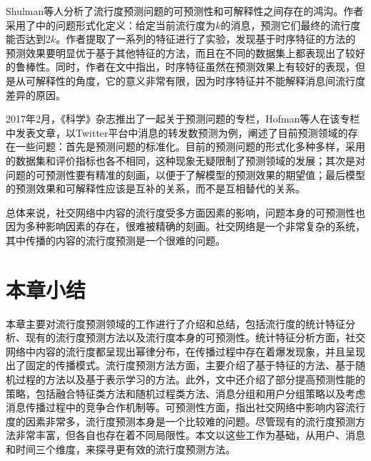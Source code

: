 Shulman等人\citep{shulman2016predictability}分析了流行度预测问题的可预测性和可解释性之间存在的鸿沟。作者采用了\citep{cheng2014can}中的问题形式化定义：给定当前流行度为$k$的消息，预测它们最终的流行度能否达到$2k$。作者提取了一系列的特征进行了实验，发现基于时序特征的方法的预测效果要明显优于基于其他特征的方法，而且在不同的数据集上都表现出了较好的鲁棒性。同时，作者在文中指出，时序特征虽然在预测效果上有较好的表现，但是从可解释性的角度，它的意义非常有限，因为时序特征并不能解释消息间流行度差异的原因。

2017年2月，《科学》杂志推出了一起关于预测问题的专栏\citep{Jasny468}，Hofman等人在该专栏中发表文章\citep{hofman2017prediction}，以Twitter平台中消息的转发数预测为例，阐述了目前预测领域的存在一些问题：首先是预测问题的标准化。目前的预测问题的形式化多种多样，采用的数据集和评价指标也各不相同，这种现象无疑限制了预测领域的发展；其次是对问题的可预测性要有精准的刻画，以便于了解模型的预测效果的期望值；最后模型的预测效果和可解释性应该是互补的关系，而不是互相替代的关系。

总体来说，社交网络中内容的流行度受多方面因素的影响，问题本身的可预测性也因为多种影响因素的存在，很难被精确的刻画。社交网络是一个非常复杂的系统，其中传播的内容的流行度预测是一个很难的问题。

\section{本章小结}
本章主要对流行度预测领域的工作进行了介绍和总结，包括流行度的统计特征分析、现有的流行度预测方法以及流行度本身的可预测性。统计特征分析方面，社交网络中内容的流行度都呈现出幂律分布，在传播过程中存在着爆发现象，并且呈现出了固定的传播模式。流行度预测方法方面，主要介绍了基于特征的方法、基于随机过程的方法以及基于表示学习的方法。此外，文中还介绍了部分提高预测性能的策略，包括融合特征类方法和随机过程类方法、消息分组和用户分组策略以及考虑消息传播过程中的竞争合作机制等。可预测性方面，指出社交网络中影响内容流行度的因素非常多，流行度预测本身是一个比较难的问题。尽管现有的流行度预测方法非常丰富，但各自也存在着不同局限性。本文以这些工作为基础，从用户、消息和时间三个维度，来探寻更有效的流行度预测方法。
